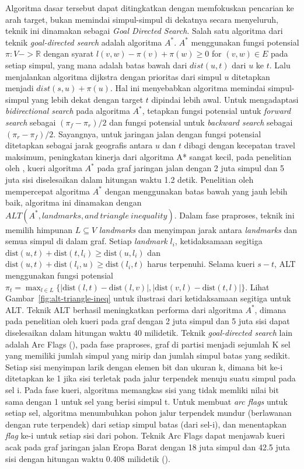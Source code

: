 Algoritma dasar tersebut dapat ditingkatkan dengan memfokuskan pencarian ke arah target, bukan memindai simpul-simpul di dekatnya secara menyeluruh, teknik ini dinamakan sebagai \textit{Goal Directed Search}. Salah satu algoritma dari teknik \textit{goal-directed search} adalah algoritma $A^*$. $A^*$ menggunakan fungsi potensial $\pi:V->\mathbb{R}$ dengan syarat $l(v,w)-\pi(v)+\pi(w)\ge0$ for $(v,w)\in E$  pada setiap simpul, yang mana adalah batas bawah dari $dist(u,t)$ dari $u$ ke $t$. Lalu menjalankan algoritma dijkstra dengan prioritas dari simpul $u$ ditetapkan menjadi $dist(s,u)+\pi(u)$.  Hal ini menyebabkan algoritma memindai simpul-simpul yang lebih dekat dengan target $t$ dipindai lebih awal. Untuk mengadaptasi \textit{bidirectional search} pada algoritma $A^*$, tetapkan fungsi potensial untuk \textit{forward search} sebagai $(\pi_f-\pi_r)/2$  dan fungsi potensial untuk \textit{backward search} sebagai $(\pi_r-\pi_f)/2$. Sayangnya, untuk jaringan jalan dengan fungsi potensial ditetapkan sebagai jarak geografis antara $u$ dan $t$ dibagi dengan kecepatan travel maksimum, peningkatan kinerja dari algoritma A* sangat kecil, pada penelitian oleh \cite{Goldberg2005}, kueri algoritma $A^*$ pada graf jaringan jalan dengan 2 juta simpul dan 5 juta sisi diselesaikan dalam hitungan waktu 1.2 detik. Penelitian oleh \cite{Goldberg2005} mempercepat algoritma $A^*$ dengan menggunakan batas bawah yang jauh lebih baik, algoritma ini dinamakan dengan $ALT(A^*,landmarks, and \ triangle \ inequality)$. Dalam fase praproses, teknik ini memilih himpunan $L\subseteq V$ \textit{landmarks} dan menyimpan jarak antara \textit{landmarks} dan semua simpul di dalam graf. Setiap \textit{landmark} $l_i$, ketidaksamaan segitiga $\text{dist}(u,t)+\text{dist}(t,l_i)\geq\text{dist}(u,l_i)$ dan $\text{dist}(u,t)+\text{dist}(l_i,u)\geq\text{dist}(l_i,t)$ harus terpenuhi. Selama kueri $s-t$, ALT menggunakan fungsi potensial $\pi_t=\max_{l \in L} \Big\{ | \text{dist}(l,t)-\text{dist}(l,v)|,|\text{dist}(v,l)-\text{dist}(t,l)|\Big\}$. Lihat Gambar~\ref{fig:alt-triangle-ineq} untuk ilustrasi dari ketidaksamaan segitiga untuk ALT. Teknik ALT berhasil meningkatkan performa dari algoritma $A^*$, dimana pada penelitian oleh \cite{Goldberg2005} kueri pada graf dengan 2 juta simpul dan 5 juta sisi dapat diselesaikan dalam hitungan waktu 40 milidetik. Teknik \textit{goal-directed search} lain adalah Arc Flags (\cite{Kohler2005}), pada fase praproses, graf di partisi menjadi sejumlah K sel yang memiliki jumlah simpul yang mirip dan jumlah simpul batas yang sedikit. Setiap sisi menyimpan larik dengan elemen bit dan ukuran k, dimana bit ke-i ditetapkan ke 1 jika sisi terletak pada jalur terpendek menuju suatu simpul pada sel i. Pada fase kueri, algoritma memangkas sisi yang tidak memliki nilai bit sama dengan 1 untuk sel yang berisi simpul t. Untuk membuat \textit{arc flags} untuk setiap sel, algoritma menumbuhkan pohon jalur terpendek mundur (berlawanan dengan rute terpendek) dari setiap simpul batas (dari sel-i), dan menentapkan \textit{flag} ke-i untuk setiap sisi dari pohon. Teknik Arc Flags dapat menjawab kueri acak pada graf jaringan jalan Eropa Barat dengan 18 juta simpul dan 42.5 juta sisi dengan hitungan waktu 0.408 milidetik (\cite{Bast2015}).

